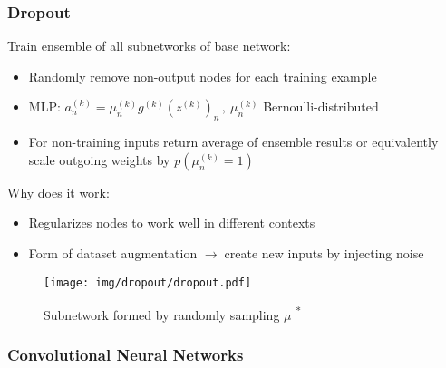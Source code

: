 \documentclass{beamer}
\newcommand{\arrow}{$\rightarrow\;$}
\renewcommand{\k}[2]{#1^{(#2)}}
\begin{document}
\begin{frame}
    \frametitle{Dropout}
    Train ensemble of all subnetworks of base network:
    \begin{itemize}
        \item Randomly remove non-output nodes for each training example
        \item MLP: $\k{a}{k}_n = \k{\mu}{k}_n \k{g}{k}(\k{z}{k})_n\,, \ \k{\mu}{k}_n$ Bernoulli-distributed
        \item For non-training inputs return average of ensemble results or
        equivalently scale outgoing weights by $p(\k{\mu}{k}_n = 1)$
    \end{itemize}
    \vspace{-0.5cm}
    \begin{minipage}{0.49\textwidth}
        \vspace{0.3cm}
        Why does it work:
        \begin{itemize}
            \item Regularizes nodes to work well in different contexts
            \item Form of dataset augmentation
            \arrow create new inputs by injecting noise
        \end{itemize}
    \end{minipage}
    \hspace{1em}
    \begin{minipage}{0.4\textwidth}
        \vspace{1cm}
        \begin{figure}
            \texttt{[image: img/dropout/dropout.pdf]}
            
            \caption{Subnetwork formed by randomly sampling $\mu$ \cite{dropout}\textsuperscript{*}}
        \end{figure}
    \end{minipage}
\end{frame}

\begin{frame}
    \frametitle{Convolutional Neural Networks}
\end{frame}
\end{document}
